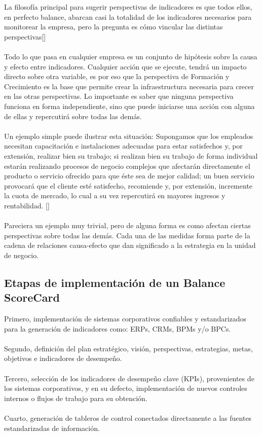 \documentclass[10pt,a4paper]{article}
\begin{document}
			La filosofía principal para sugerir perspectivas de indicadores es que todos ellos, en perfecto balance, abarcan casi la totalidad de los indicadores necesarios para monitorear la empresa, pero la pregunta es cómo vincular las distintas perspectivas[\cite{baraybar2011cuadro}]\\
			\\
			Todo lo que pasa en cualquier empresa es un conjunto de hipótesis sobre la causa y efecto entre indicadores. Cualquier acción que se ejecute, tendrá un impacto directo sobre otra variable, es por eso que la perspectiva de Formación y Crecimiento es la base que permite crear la infraestructura necesaria para crecer en las otras perspectivas. Lo importante es saber que ninguna perspectiva funciona en forma independiente, sino que puede iniciarse una acción con alguna de ellas y repercutirá sobre todas las demás.\\
			\\
			Un ejemplo simple puede ilustrar esta situación: Supongamos que los empleados necesitan capacitación e instalaciones adecuadas para estar satisfechos y, por extensión, realizar bien su trabajo; si realizan bien su trabajo de forma individual estarán realizando procesos de negocio complejos que afectarán directamente el producto o servicio ofrecido para que éste sea de mejor calidad; un buen servicio provocará que el cliente esté satisfecho, recomiende y, por extensión, incremente la cuota de mercado, lo cual a su vez repercutirá en mayores ingresos y rentabilidad. [\cite{fernandez2001balanced}]\\
			\\
			Pareciera un ejemplo muy trivial, pero de alguna forma es como afectan ciertas perspectivas sobre todas las demás. Cada una de las medidas forma parte de la cadena de relaciones causa-efecto que dan significado a la estrategia en la unidad de negocio.
			
			\subsection{Etapas de implementación  de un Balance ScoreCard}
			
			Primero, implementación de sistemas corporativos confiables y estandarizados para la generación de indicadores como: ERPs, CRMs, BPMs y/o BPCs.\\
			\\
			Segundo, definición del plan estratégico, visión, perspectivas, estrategias, metas, objetivos e indicadores de desempeño.\\
			\\
			Tercero, selección de los indicadores de desempeño clave (KPIs), provenientes de los sistemas corporativos, y en su defecto, implementación de nuevos controles internos o flujos de trabajo para su obtención.\\
			\\
			Cuarto, generación de tableros de control conectados directamente a las fuentes estandarizadas de información.
		
\end{document}
